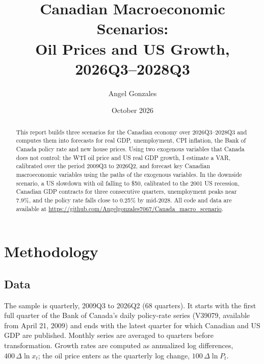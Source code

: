\documentclass[11pt]{article}
\title{Canadian Macroeconomic Scenarios:\\ Oil Prices and US Growth, 2026Q3--2028Q3}
\author{Angel Gonzales}
\date{October 2026}
\begin{document}
\maketitle

\begin{abstract}
\noindent This report builds three scenarios for the Canadian economy over 2026Q3--2028Q3 and computes them into forecasts for real GDP, unemployment, CPI inflation, the Bank of Canada policy rate and new house prices. Using two exogenous variables that Canada does not control: the WTI oil price and US real GDP growth, 
I estimate a VAR, calibrated over the period 2009Q3 to 2026Q2, and forecast key Canadian macroeconomic variables using the paths of the exogenous variables. In the downside
scenario, a US slowdown with oil falling to \$50, calibrated to the 2001 US recession, Canadian GDP
contracts for three consecutive quarters, unemployment peaks near 7.9\%, and the policy rate falls close
to 0.25\% by mid-2028. All code and data are available at \url{https://github.com/Angelgonzales7067/Canada_macro_scenario}.
\end{abstract}

\section{Methodology}

\subsection{Data}

The sample is quarterly, 2009Q3 to 2026Q2 (68 quarters). It starts with the first full quarter of the
Bank of Canada's daily policy-rate series (V39079, available from April 21, 2009) and ends with the
latest quarter for which Canadian and US GDP are published. Monthly series are averaged to quarters
before transformation. Growth rates are computed as annualized log differences, $400\,\Delta\ln x_t$;
the oil price enters as the quarterly log change, $100\,\Delta\ln P_t$.
\end{document}

